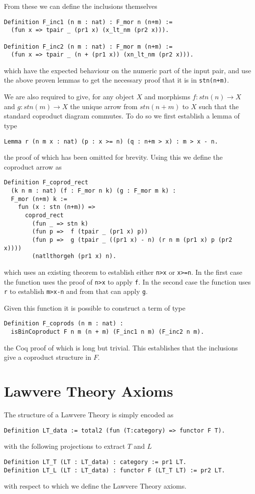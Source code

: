 From these we can define the inclusions themselves
\begin{lstlisting}
Definition F_inc1 (n m : nat) : F_mor n (n+m) := 
  (fun x => tpair _ (pr1 x) (x_lt_nm (pr2 x))).

Definition F_inc2 (n m : nat) : F_mor m (n+m) := 
  (fun x => tpair _ (n + (pr1 x)) (xn_lt_nm (pr2 x))).
\end{lstlisting}
which have the expected behaviour on the numeric part of the input pair, and use
the above proven lemmas to get the necessary proof that it is in
\lstinline|stn(n+m)|.

We are also required to give, for any object $X$ and morphisms $f: stn(n)\to X$
and $g: stn(m)\to X$ the unique arrow from $stn(n+m)$ to $X$ such that the
standard coproduct diagram commutes. To do so we first establish a lemma of type
\begin{lstlisting}
Lemma r (n m x : nat) (p : x >= n) (q : n+m > x) : m > x - n.
\end{lstlisting}
the proof of which has been omitted for brevity. Using this we define the
coproduct arrow as
\begin{lstlisting}
Definition F_coprod_rect 
  (k n m : nat) (f : F_mor n k) (g : F_mor m k) : 
  F_mor (n+m) k :=
    fun (x : stn (n+m)) => 
      coprod_rect 
        (fun _ => stn k)
        (fun p =>  f (tpair _ (pr1 x) p))
        (fun p =>  g (tpair _ ((pr1 x) - n) (r n m (pr1 x) p (pr2 x))))
        (natlthorgeh (pr1 x) n).
\end{lstlisting}
which uses an existing theorem to establish either \lstinline|n>x| or
\lstinline|x>=n|. In the first case the function uses the proof of
\lstinline|n>x| to apply \lstinline|f|. In the second case the function uses
\lstinline|r| to establish \lstinline|m>x-n| and from that can apply
\lstinline|g|.

Given this function it is possible to construct a term of type
\begin{lstlisting}
Definition F_coprods (n m : nat) : 
  isBinCoproduct F n m (n + m) (F_inc1 n m) (F_inc2 n m).
\end{lstlisting}
the Coq proof of which is long but trivial. This establishes that the inclusions
give a coproduct structure in $F$.

\section{Lawvere Theory Axioms}
The structure of a Lawvere Theory is simply encoded as
\begin{lstlisting}
Definition LT_data := total2 (fun (T:category) => functor F T).
\end{lstlisting}
with the following projections to extract $T$ and $L$
\begin{lstlisting}
Definition LT_T (LT : LT_data) : category := pr1 LT.
Definition LT_L (LT : LT_data) : functor F (LT_T LT) := pr2 LT.
\end{lstlisting}
with respect to which we define the Lawvere Theory axioms.

